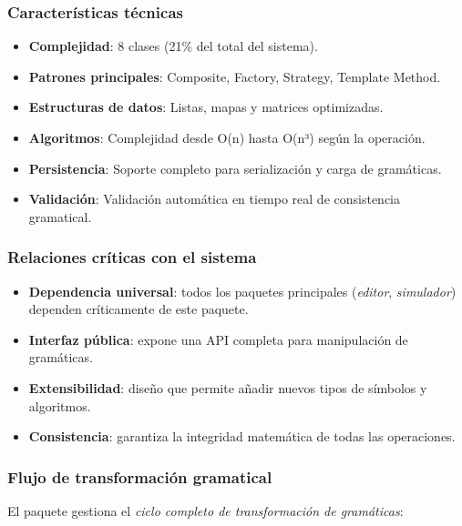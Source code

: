 \subsubsection{Características técnicas}

\begin{itemize}
    \item \textbf{Complejidad}: 8 clases (21\% del total del sistema).
    \item \textbf{Patrones principales}: Composite, Factory, Strategy, Template Method.
    \item \textbf{Estructuras de datos}: Listas, mapas y matrices optimizadas.
    \item \textbf{Algoritmos}: Complejidad desde O(n) hasta O(n³) según la operación.
    \item \textbf{Persistencia}: Soporte completo para serialización y carga de gramáticas.
    \item \textbf{Validación}: Validación automática en tiempo real de consistencia gramatical.
\end{itemize}

\subsubsection{Relaciones críticas con el sistema}

\begin{itemize}
    \item \textbf{Dependencia universal}: todos los paquetes principales (\textit{editor}, \textit{simulador}) dependen críticamente de este paquete.
    \item \textbf{Interfaz pública}: expone una API completa para manipulación de gramáticas.
    \item \textbf{Extensibilidad}: diseño que permite añadir nuevos tipos de símbolos y algoritmos.
    \item \textbf{Consistencia}: garantiza la integridad matemática de todas las operaciones.
\end{itemize}

\subsubsection{Flujo de transformación gramatical}

El paquete gestiona el \textit{ciclo completo de transformación de gramáticas}:

